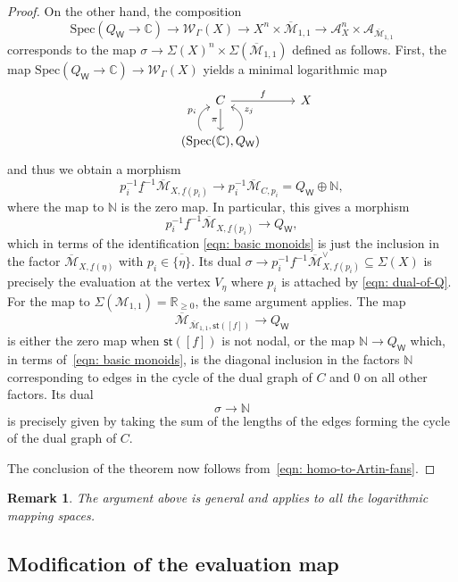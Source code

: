 \documentclass{article}
\def\N{{\mathbb{N}}}
\def\cM{{\overline{\mathcal{M}}}}
\def\oM{\overline{\mathcal{M}}}
\def\cM{{\mathcal{M}}}
\def\C{\mathbb{C}}
\def\WG{\mathcal{W}_{\Gamma}}
\newtheorem{remark}[definition]{Remark}
\newcommand{\W}{\mathsf{W}}
\begin{document}
\begin{proof}
    On the other hand, the composition 
    $$
    \mathrm{Spec}(Q_\W \to \C) \to \WG(X) \to X^n \times \oM_{1,1} \to \mathcal{A}_{X}^n \times \mathcal{A}_{\oM_{1,1}}
    $$
    corresponds to the map $\sigma \to \Sigma(X)^n \times \Sigma(\oM_{1,1})$ defined as follows. First, the map $\mathrm{Spec}(Q_\W \to \C) \to \WG(X)$ yields a minimal logarithmic map
    \[
    \begin{tikzcd}
    & C \arrow[r, "f"] \arrow[d, "\pi"'] & X \\
    &(\mathrm{Spec}(\C),Q_\W) \arrow[u, bend left=60, "p_i"] \arrow[u, bend right=60, "z_j"'] 
    \end{tikzcd}
    \]
    and thus we obtain a morphism
    \[
    p_i^{-1} \underline{f}^{-1} \overline{\mathcal{M}}_{X,\underline{f}(p_i)} \longrightarrow p_i^{-1} \overline{\mathcal{M}}_{C,p_i} = Q_\W \oplus \mathbb{N},
    \]
    where the map to $\mathbb{N}$ is the zero map. In particular, this gives a morphism
    \[
    p_i^{-1} \underline{f}^{-1} \overline{\mathcal{M}}_{X,\underline{f}(p_i)} \longrightarrow Q_\W,
    \]
    which in terms of the identification \eqref{eqn: basic monoids} is just the inclusion in the factor $\oM_{X,\underline{f}(\eta)}$ with $p_i \in \overline{\{ \eta\}}$. Its dual $\sigma \to p_i^{-1} f^{-1} \overline{\mathcal{M}}_{X,f(p_i)}^\vee \subseteq \Sigma(X)$ is precisely the evaluation at the vertex $V_\eta$ where $p_i$ is attached by \eqref{eqn: dual-of-Q}. For the map to $\Sigma(\cM_{1,1}) = \mathbb{R}_{\ge 0}$, the same argument applies. The map
\[
\overline{\mathcal{M}}_{\oM_{1,1}, \mathsf{st}([f])} \longrightarrow Q_\W
\]
is either the zero map when $\mathsf{st}([f])$ is not nodal, or the map $\mathbb{N} \to Q_\W$ which, in terms of~\eqref{eqn: basic monoids}, is the diagonal inclusion in the factors $\mathbb{N}$ corresponding to edges in the cycle of the dual graph of $C$ and $0$ on all other factors. Its dual
\[
\sigma \longrightarrow \N
\]
is precisely given by taking the sum of the lengths of the edges forming the cycle of the dual graph of $C$.

The conclusion of the theorem now follows from~\eqref{eqn: homo-to-Artin-fans}.
\end{proof}

\begin{remark}
    The argument above is general and applies to all the logarithmic mapping spaces.
\end{remark}

\subsection{Modification of the evaluation map}
\end{document}
